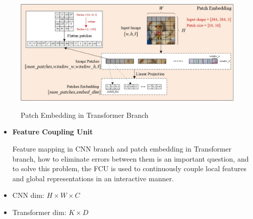 \documentclass[CJK,aspectratio=169]{beamer}  %
\begin{document}
	\begin{frame}
		\begin{figure}
			\centering
			\begin{minipage}{.95\textwidth}
				\includegraphics[width=\linewidth]{picture/LLIE/My Architecture/Patch Embedding(ViT)}
				\captionsetup{font=scriptsize}
				\caption{Patch Embedding in Transformer Branch}
			\end{minipage}
			\captionsetup{font=scriptsize}
			\caption*{
				\label{fig: Patch Embedding in ViT}
			}
		\end{figure}
	\end{frame}
	
	\begin{frame}
		\begin{itemize} 
			\item \textbf{Feature Coupling Unit}
			
			Feature mapping in CNN branch and patch embedding in Transformer branch, how to eliminate errors between them is an important question, and to solve this problem, the FCU is used to continuously couple local features and global representations in an interactive manner.
			
			\item[\checkmark] CNN dim: $H \times W \times C$
			
			\item[\checkmark] Transformer dim: $K \times D$
			
		\end{itemize}
	\end{frame}
	
\end{document}
